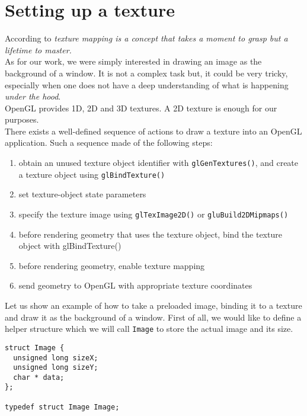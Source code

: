 \section{Setting up a texture}
\label{opengl:setting_texture}
\lstset{language=C++}

According to \cite{opengl:distilled} \textit{texture mapping 
is a concept that takes a moment to grasp but a lifetime 
to master.}
\\
As for our work, we were simply interested in drawing an 
image as the background of a window. It is not a complex 
task but, it could be very tricky, especially when one 
does not have a deep understanding of what is happening 
\textit{under the hood}.
\\
OpenGL provides 1D, 2D and 3D textures. A 2D texture is enough for our
purposes.
\\
There exists a well-defined sequence of actions to draw a texture 
into an OpenGL application. Such a sequence made of the following steps:

\begin{enumerate}
\item obtain an unused texture object identifier with \texttt{glGenTextures()}, 
  and create a texture object using \texttt{glBindTexture()}
\item set texture-object state parameters
\item specify the texture image using \texttt{glTexImage2D()} 
  or \texttt{gluBuild2DMipmaps()}
\item before rendering geometry that uses the texture object, 
  bind the texture object with glBindTexture()
\item before rendering geometry, enable texture mapping
\item send geometry to OpenGL with appropriate texture 
  coordinates
\end{enumerate}

Let us show an example of how to take a preloaded image, binding it 
to a texture and draw it as the background of a window. First of all, 
we would like to define a helper structure which we will call \texttt{Image}
to store the actual image and its size.

\begin{lstlisting}[caption={The Image structure}, label={code:image}, frame=trBL]
struct Image {
  unsigned long sizeX;
  unsigned long sizeY;
  char * data;
};

typedef struct Image Image;
\end{lstlisting}

